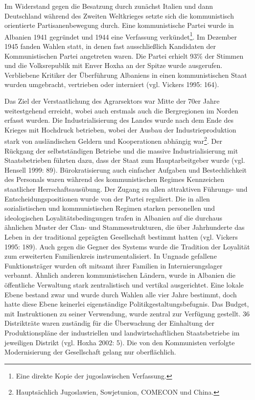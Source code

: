 Im Widerstand gegen die Besatzung durch zunächst Italien und dann Deutschland während des Zweiten Weltkrieges setzte sich die kommunistisch orientierte Partisanenbewegung durch. Eine kommunistische Partei wurde in Albanien 1941 gegründet und 1944 eine Verfassung verkündet\footnote{Eine direkte Kopie der jugoslawischen Verfassung.}. Im Dezember 1945 fanden Wahlen statt, in denen fast ausschließlich Kandidaten der Kommunistischen Partei angetreten waren. Die Partei erhielt 93\% der Stimmen und die Volksrepublik mit Enver Hoxha an der Spitze wurde ausgerufen. Verbliebene Kritiker der Überführung Albaniens in einen kommunistischen Staat wurden umgebracht, vertrieben oder interniert (vgl. Vickers 1995: 164).\par
Das Ziel der Verstaatlichung des Agrarsektors war Mitte der 70er Jahre weitestgehend erreicht, wobei auch erstmals auch die Bergregionen im Norden erfasst wurden. Die Industrialisierung des Landes wurde nach dem Ende des Krieges mit Hochdruck betrieben, wobei der Ausbau der Industrieproduktion stark von ausländischen Geldern und Kooperationen abhängig war\footnote{Hauptsächlich Jugoslawien, Sowjetunion, COMECON und China.}. Der Rückgang der selbstständigen Betriebe und die massive Industrialisierung mit Staatsbetrieben führten dazu, dass der Staat zum Hauptarbeitgeber wurde (vgl. Hensell 1999: 89). Bürokratisierung auch einfacher Aufgaben und Bestechlichkeit des Personals waren während des kommunistischen Regimes Kennzeichen staatlicher Herrschaftsausübung. Der Zugang zu allen attraktiven Führungs- und Entscheidungspositionen wurde von der Partei reguliert. Die in allen sozialistischen und kommunistischen Regimen starken personellen und ideologischen Loyalitätsbedingungen trafen in Albanien auf die durchaus ähnlichen Muster der Clan- und Stammesstrukturen, die über Jahrhunderte das Leben in der traditional geprägten Gesellschaft bestimmt hatten (vgl. Vickers 1995: 189). Auch gegen die Gegner des Systems wurde die Tradition der Loyalität zum erweiterten Familienkreis instrumentalisiert. In Ungnade gefallene Funktionsträger wurden oft mitsamt ihrer Familien in Internierungslager verbannt. Ähnlich anderen kommunistischen Ländern, wurde in Albanien die öffentliche Verwaltung stark zentralistisch und vertikal ausgerichtet. Eine lokale Ebene bestand zwar und wurde durch Wahlen alle vier Jahre bestimmt, doch hatte diese Ebene keinerlei eigenständige Politikgestaltungsbefugnis. Das Budget, mit Instruktionen zu seiner Verwendung, wurde zentral zur Verfügung gestellt. 36 Distrikträte waren zuständig für die Überwachung der Einhaltung der Produktionspläne der industriellen und landwirtschaftlichen Staatsbetriebe im jeweiligen Distrikt (vgl. Hoxha 2002: 5). Die von den Kommunisten verfolgte Modernisierung der Gesellschaft gelang nur oberflächlich.

